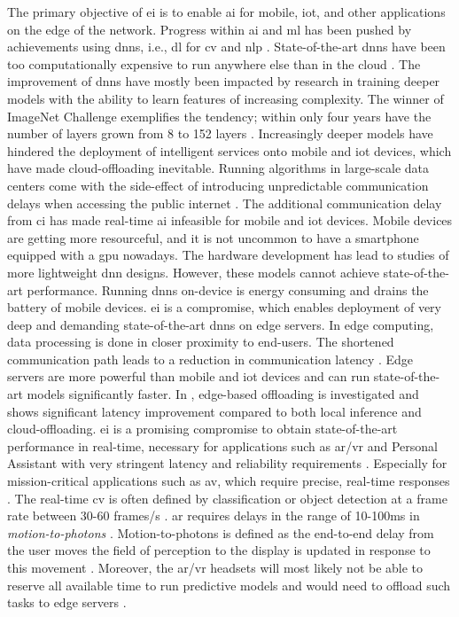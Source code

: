 The primary objective of \gls{ei} is to enable \gls{ai} for mobile, \gls{iot}, and other applications on the edge of the network. Progress within \gls{ai} and \gls{ml} has been pushed by achievements using \gls{dnn}s, i.e., \gls{dl} for \acrfull{cv} and \gls{nlp} \cite{stoica_berkeley_2017}. State-of-the-art \gls{dnn}s have been too computationally expensive to run anywhere else than in the cloud \cite{zhou_edge_2019}. The improvement of \gls{dnn}s have mostly been impacted by research in training deeper models with the ability to learn features of increasing complexity. The winner of ImageNet Challenge exemplifies the tendency; within only four years have the number of layers grown from 8 to 152 layers \cite{russakovsky_imagenet_2015}. Increasingly deeper models have hindered the deployment of intelligent services onto mobile and \gls{iot} devices, which have made cloud-offloading inevitable. Running algorithms in large-scale data centers come with the side-effect of introducing unpredictable communication delays when accessing the public internet \cite{shi_edge_2016}. The additional communication delay from \gls{ci} has made real-time \gls{ai} infeasible for mobile and \gls{iot} devices. Mobile devices are getting more resourceful, and it is not uncommon to have a smartphone equipped with a \gls{gpu} nowadays. The hardware development has lead to studies of more lightweight \gls{dnn} designs. However, these models cannot achieve state-of-the-art performance. Running \gls{dnn}s on-device is energy consuming and drains the battery of mobile devices.
\gls{ei} is a compromise, which enables deployment of very deep and demanding state-of-the-art \gls{dnn}s on edge servers. In edge computing, data processing is done in closer proximity to end-users. The shortened communication path leads to a reduction in communication latency \cite{zhou_edge_2019,shi_edge_2016}. Edge servers are more powerful than mobile and \gls{iot} devices and can run state-of-the-art models significantly faster. In \cite{karlsen_prototyping_nodate}, edge-based offloading is investigated and shows significant latency improvement compared to both local inference and cloud-offloading. \gls{ei} is a promising compromise to obtain state-of-the-art performance in real-time, necessary for applications such as \gls{ar}/\gls{vr} and Personal Assistant with very stringent latency and reliability requirements \cite{zhou_edge_2019}. Especially for mission-critical applications such as \gls{av}, which require precise, real-time responses \cite{stoica_berkeley_2017}. The real-time \gls{cv} is often defined by classification or object detection at a frame rate between 30-60 frames/s \cite{chen_deep_2019}. \gls{ar} requires delays in the range of 10-100ms in \emph{motion-to-photons} \cite{chen_deep_2019}. Motion-to-photons is defined as the end-to-end delay from the user moves the field of perception to the display is updated in response to this movement \cite{lavalle_virtual_2019}. Moreover, the \gls{ar}/\gls{vr} headsets will most likely not be able to reserve all available time to run predictive models and would need to offload such tasks to edge servers \cite{chen_deep_2019}.

